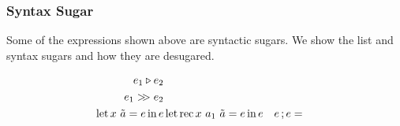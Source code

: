 \subsubsection{Syntax Sugar}
Some of the expressions shown above are syntactic sugars.
We show the list and syntax sugars and how they are desugared.

\begin{align*}
        e_1 \triangleright e_2 & \\
        e_1 >\!\!> e_2 &\\
        \operatorname{\text{let}} x\ \tilde{a} = e \operatorname{\text{in}} e&
        \operatorname{\text{let}} \operatorname{\text{rec}} x\ a_1\ \tilde{a} = e \operatorname{\text{in}} e&
        e\operatorname{;}{}e &=
\end{align*}

